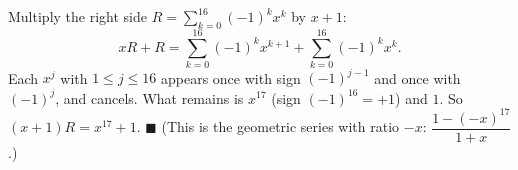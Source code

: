 Multiply the right side $R=\sum_{k=0}^{16}(-1)^kx^k$ by $x+1$:
\[xR+R=\sum_{k=0}^{16}(-1)^kx^{k+1}+\sum_{k=0}^{16}(-1)^kx^k.\]
Each $x^j$ with $1\le j\le16$ appears once with sign $(-1)^{j-1}$ and once with $(-1)^j$, and cancels. What remains is $x^{17}$ (sign $(-1)^{16}=+1$) and $1$. So $(x+1)R=x^{17}+1$. $\blacksquare$ (This is the geometric series with ratio $-x$: $\dfrac{1-(-x)^{17}}{1+x}$.)
